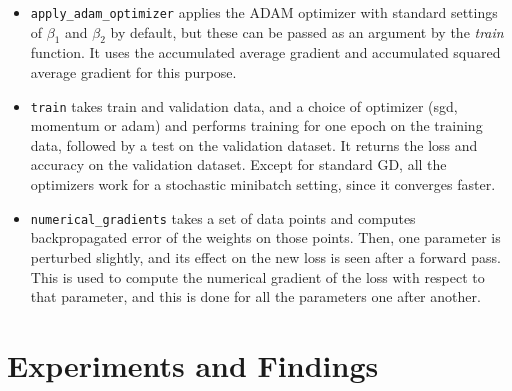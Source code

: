 \documentclass[12pt, a4paper]{article}
\begin{document}
\begin{itemize}
\item \texttt{apply\_adam\_optimizer} applies the ADAM optimizer with standard settings of $\beta_1$ and $\beta_2$ by default, but these can be passed as an argument by the \textit{train} function. It uses the accumulated average gradient and accumulated squared average gradient for this purpose. 

\item \texttt{train} takes train and validation data, and a choice of optimizer (sgd, momentum or adam) and performs training for one epoch on the training data, followed by a test on the validation dataset. It returns the loss and accuracy on the validation dataset. Except for standard GD, all the optimizers work for a stochastic minibatch setting, since it converges faster. 

\item \texttt{numerical\_gradients} takes a set of data points and computes backpropagated error of the weights on those points. Then, one parameter is perturbed slightly, and its effect on the new loss is seen after a forward pass. This is used to compute the numerical gradient of the loss with respect to that parameter, and this is done for all the parameters one after another.
 
 
\end{itemize}

\section{Experiments and Findings}




\end{document}
